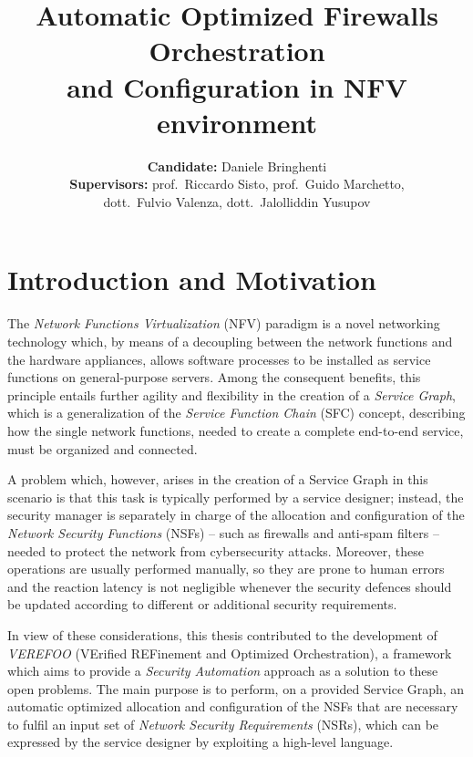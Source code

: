 \documentclass[10pt,a4paper,roman, twocolumn]{article}
\title{\LARGE\textbf{Automatic Optimized Firewalls Orchestration \\and Configuration in NFV environment }}
\author{
	\textbf{Candidate:} Daniele Bringhenti\\
	\textbf{Supervisors:} prof.~Riccardo Sisto, prof.~Guido Marchetto, \\ dott.~Fulvio Valenza, dott.~Jalolliddin Yusupov
}
\date{}
\begin{document}
\setlength{\belowdisplayskip}{0pt} \setlength{\belowdisplayshortskip}{0pt}
\setlength{\abovedisplayskip}{-0.5\baselineskip} \setlength{\abovedisplayshortskip}{-0.5\baselineskip}

	
\maketitle
		
\section{Introduction and Motivation}

The \textit{Network Functions Virtualization} (NFV) paradigm is a novel networking technology which, by means of a decoupling between the network functions and the hardware appliances, allows software processes to be installed as service functions on general-purpose servers. Among the consequent benefits, this principle entails further agility and flexibility in the creation of a \textit{Service Graph}, which is a generalization of the \textit{Service Function Chain} (SFC) concept, describing how the single network functions, needed to create a complete end-to-end service, must be organized and connected.

A problem which, however, arises in the creation of a Service Graph in this scenario is that this task is typically performed by a service designer; instead, the security manager is separately in charge of the allocation and configuration of the \textit{Network Security Functions} (NSFs) -- such as firewalls and anti-spam filters -- needed to protect the network from cybersecurity attacks. Moreover, these operations are usually performed manually, so they are prone to human errors and the reaction latency is not negligible whenever the security defences should be updated according to different or additional security requirements.

In view of these considerations, this thesis contributed to the development of \textit{VEREFOO} (VErified REFinement and Optimized Orchestration), a framework which aims to provide a \textit{Security Automation} approach as a solution to these open problems. The main purpose is to perform, on a provided Service Graph, an automatic optimized allocation and configuration of the NSFs that are necessary to fulfil an input set of \textit{Network Security Requirements} (NSRs), which can be expressed by the service designer by exploiting a high-level language.
\end{document}

